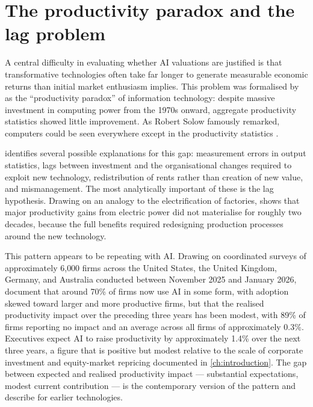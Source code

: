 \section{The productivity paradox and the lag problem}
\label{sec:productivity-paradox}

A central difficulty in evaluating whether AI valuations are justified is that transformative technologies often take far longer to generate measurable economic returns than initial market enthusiasm implies. This problem was formalised by \citet{brynjolfsson1993} as the ``productivity paradox'' of information technology: despite massive investment in computing power from the 1970s onward, aggregate productivity statistics showed little improvement. As Robert Solow famously remarked, computers could be seen everywhere except in the productivity statistics \citep{brynjolfsson1993}.

\citet{brynjolfsson1993} identifies several possible explanations for this gap: measurement errors in output statistics, lags between investment and the organisational changes required to exploit new technology, redistribution of rents rather than creation of new value, and mismanagement. The most analytically important of these is the lag hypothesis. Drawing on an analogy to the electrification of factories, \citet{david1990} shows that major productivity gains from electric power did not materialise for roughly two decades, because the full benefits required redesigning production processes around the new technology.

This pattern appears to be repeating with AI. Drawing on coordinated surveys of approximately 6{,}000 firms across the United States, the United Kingdom, Germany, and Australia conducted between November 2025 and January 2026, \citet{yotzovEtAl2026} document that around 70\% of firms now use AI in some form, with adoption skewed toward larger and more productive firms, but that the realised productivity impact over the preceding three years has been modest, with 89\% of firms reporting no impact and an average across all firms of approximately 0.3\%. Executives expect AI to raise productivity by approximately 1.4\% over the next three years, a figure that is positive but modest relative to the scale of corporate investment and equity-market repricing documented in \cref{ch:introduction}. The gap between expected and realised productivity impact --- substantial expectations, modest current contribution --- is the contemporary version of the pattern \citet{brynjolfsson1993} and \citet{david1990} describe for earlier technologies.


